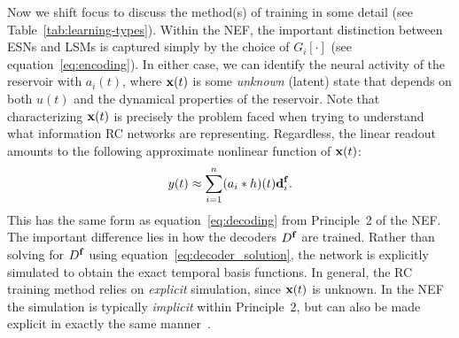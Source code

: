 Now we shift focus to discuss the method(s) of training in some detail (see Table~\ref{tab:learning-types}).
Within the NEF, the important distinction between ESNs and LSMs is captured simply by the choice of $G_i \left[ \cdot \right]$ (see equation~\ref{eq:encoding}).
In either case, we can identify the neural activity of the reservoir with $a_i(t)$, where $\mathbf{x}(t)$ is some \emph{unknown} (latent) state that depends on both $u(t)$ and the dynamical properties of the reservoir.
Note that characterizing $\mathbf{x}(t)$ is precisely the problem faced when trying to understand what information RC networks are representing.
Regardless, the linear readout amounts to the following approximate nonlinear function of $\mathbf{x}(t)$:
\begin{equation} \label{eq:rc}
y(t) \approx \sum_{i=1}^n (a_i \ast h)(t) \mathbf{d}^{\mathbf{f}}_i \text{.}
\end{equation}
This has the same form as equation~\ref{eq:decoding} from Principle~2 of the NEF.
The important difference lies in how the decoders $D^{\mathbf{f}}$ are trained.
Rather than solving for $D^{\mathbf{f}}$ using equation~\ref{eq:decoder_solution}, the network is explicitly simulated to obtain the exact temporal basis functions.
In general, the RC training method relies on \emph{explicit} simulation, since $\mathbf{x}(t)$ is unknown. In the NEF the simulation is typically \emph{implicit} within Principle~2, but can also be made explicit in exactly the same manner~\citep{voelker2016a, duggins2017incorporating}.


